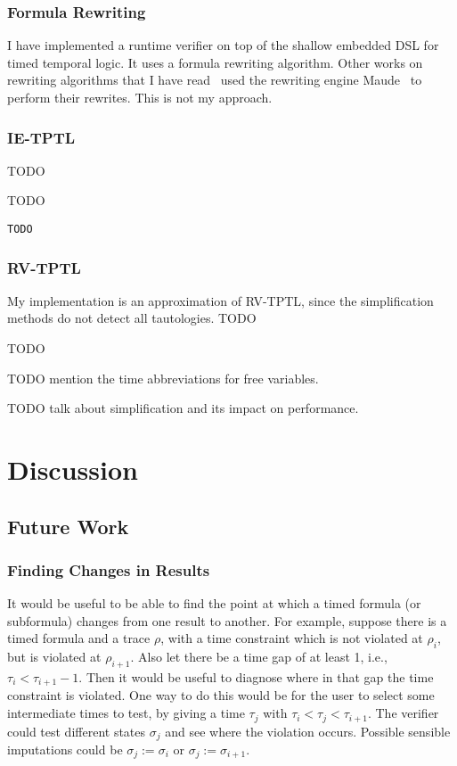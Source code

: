 \documentclass[a4paper]{article}
\begin{document}
\subsubsection{Formula Rewriting}
I have implemented a runtime verifier on top of the shallow embedded DSL for timed temporal logic. It uses a formula rewriting algorithm.
Other works on rewriting algorithms that I have read~\autocites{rosu2005rewriting,chai2013rewriting} used the rewriting engine Maude~\autocite{clavel2002maude} to perform their rewrites. This is not my approach.

\subsubsection{IE-TPTL}
TODO
\begin{eg}
  TODO
\end{eg}

\begin{lstlisting}[caption={Finalise method for IE-TPTL}]
TODO
\end{lstlisting}
\subsubsection{RV-TPTL}
My implementation is an approximation of RV-TPTL, since the simplification methods do not detect all tautologies.
TODO
\begin{eg}
  TODO
\end{eg}

TODO mention the time abbreviations for free variables.

TODO talk about simplification and its impact on performance.

\section{Discussion}
\subsection{Future Work}

\subsubsection{Finding Changes in Results}
It would be useful to be able to find the point at which a timed formula (or subformula) changes from one result to another. For example, suppose there is a timed formula and a trace $\rho$, with a time constraint which is not violated at $\rho_i$, but is violated at $\rho_{i+1}$. Also let there be a time gap of at least 1, i.e., $\tau_i < \tau_{i+1} - 1$. Then it would be useful to diagnose where in that gap the time constraint is violated. One way to do this would be for the user to select some intermediate times to test, by giving a time $\tau_j$ with $\tau_i < \tau_j < \tau_{i+1}$. The verifier could test different states $\sigma_j$ and see where the violation occurs. Possible sensible imputations could be $\sigma_j := \sigma_i$ or $\sigma_j := \sigma_{i+1}$.
\end{document}
